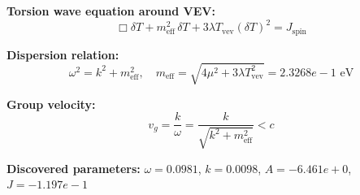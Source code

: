 
\textbf{Torsion wave equation around VEV:}
\begin{equation}
  \Box \delta T + m_{\text{eff}}^2 \, \delta T + 3\lambda T_{\text{vev}} (\delta T)^2 = J_{\text{spin}}
\end{equation}

\textbf{Dispersion relation:}
\begin{equation}
  \omega^2 = k^2 + m_{\text{eff}}^2, \quad
  m_{\text{eff}} = \sqrt{4\mu^2 + 3\lambda T_{\text{vev}}^2} = 2.3268e-1 \text{ eV}
\end{equation}

\textbf{Group velocity:}
\begin{equation}
  v_g = \frac{k}{\omega} = \frac{k}{\sqrt{k^2 + m_{\text{eff}}^2}} < c
\end{equation}

\textbf{Discovered parameters:}
$\omega = 0.0981$, \quad
$k = 0.0098$, \quad
$A = -6.461e+0$, \quad
$J = -1.197e-1$